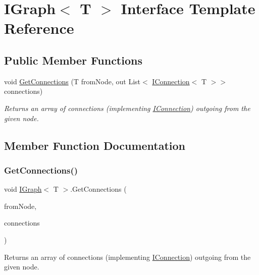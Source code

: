 \hypertarget{interface_i_graph}{}\section{I\+Graph$<$ T $>$ Interface Template Reference}
\label{interface_i_graph}
\subsection*{Public Member Functions}
\begin{DoxyCompactItemize}
\item 
void \mbox{\hyperlink{interface_i_graph_ac0a171fdc636178c7dbbaaf830d7d15a}{Get\+Connections}} (T from\+Node, out List$<$ \mbox{\hyperlink{interface_i_connection}{I\+Connection}}$<$ T $>$$>$ connections)
\begin{DoxyCompactList}\small\item\em Returns an array of connections (implementing \mbox{\hyperlink{interface_i_connection}{I\+Connection}}) outgoing from the given node. \end{DoxyCompactList}\end{DoxyCompactItemize}


\subsection{Member Function Documentation}
\mbox{\label{interface_i_graph_ac0a171fdc636178c7dbbaaf830d7d15a}} 
\subsubsection{\texorpdfstring{Get\+Connections()}{GetConnections()}}
{\footnotesize\ttfamily void \mbox{\hyperlink{interface_i_graph}{I\+Graph}}$<$ T $>$.Get\+Connections (\begin{DoxyParamCaption}\item[{T}]{from\+Node,  }\item[{out List$<$ \mbox{\hyperlink{interface_i_connection}{I\+Connection}}$<$ T $>$$>$}]{connections }\end{DoxyParamCaption})}



Returns an array of connections (implementing \mbox{\hyperlink{interface_i_connection}{I\+Connection}}) outgoing from the given node. 


